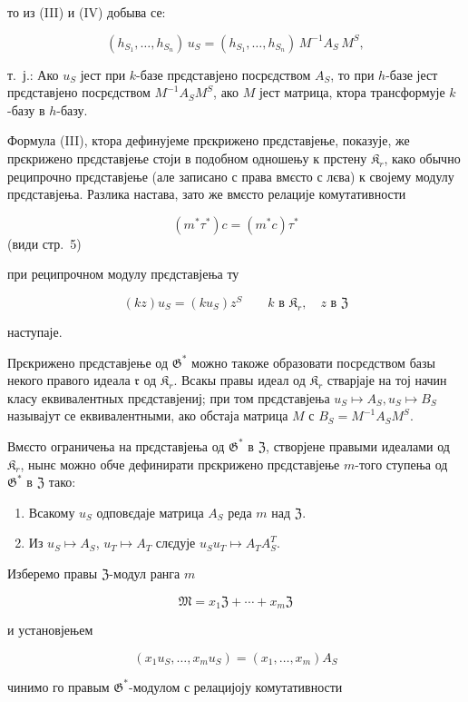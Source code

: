 \documentclass[11pt]{article}
\begin{document}
то из (III) и (IV) добыва се:

\[(h_{S_1},\ldots,h_{S_n})\,u_S=(h_{S_1},\ldots,h_{S_n})\,M^{-1}A_S\,M^S,\]

т.~ј.: Ако \(u_S\) јест при \(k\)-базе прєдставјено посрєдством \(A_S\), то при \(h\)-базе јест прєдставјено посрєдством \(M^{-1}A_SM^S\), ако \(M\) јест матрица, ктора трансформује \(k\)-базу в \(h\)-базу.

Формула (III), ктора дефинујеме прєкрижено прєдставјење, показује, же прєкрижено прєдставјење стоји в подобном одношењу к прстену \(\mathfrak K_r\), како обычно реципрочно прєдставјење (але записано с права вмєсто с лєва) к својему модулу прєдставјења. Разлика настава, зато же вмєсто релације комутативности

\[(m^*\tau^*)c = (m^*c)\tau^*\]
(види стр.~5)

при реципрочном модулу прєдставјења ту

\[
(kz)u_S=(ku_S)z^S\qquad k\text{ в }\mathfrak K_r,\quad z\text{ в }\mathfrak Z
\]

наступаје.

Прєкрижено прєдставјење од \(\mathfrak{G}^*\) можно такоже образовати посрєдством базы некого правого идеала \(\mathfrak r\) од \(\mathfrak{K}_r\). Всакы правы идеал од \(\mathfrak{K}_r\) стварјаје на тој начин класу еквивалентных прєдставјениј; при том прєдставјења \(u_S \mapsto A_S, u_S \mapsto B_S\) называјут се еквивалентными, ако обстаја матрица \(M\) с \(B_S = M^{-1}A_SM^S\).

Вмєсто ограничења на прєдставјења од \(\mathfrak G^*\) в \(\mathfrak Z\), створјене правыми идеалами од \(\mathfrak K_r\), нынє можно обче дефинирати прєкрижено прєдставјење \(m\)-того ступења од \(\mathfrak G^*\) в \(\mathfrak Z\) тако:

\begin{enumerate}
\item Всакому \(u_S\) одповєдаје матрица \(A_S\) реда \(m\) над \(\mathfrak Z\).
\item Из \(u_S \mapsto A_S\), \(u_T \mapsto A_T\) слєдује \(u_Su_T \mapsto A_TA_S^T\).
\end{enumerate}

Изберемо правы \(\mathfrak Z\)-модул ранга \(m\)

\[\mathfrak{M}=x_1\mathfrak{Z}+\cdots+x_m\mathfrak{Z}\]

и установјењем

\[(x_1u_S,\ldots,x_mu_S)=(x_1,\ldots,x_m)A_S\]

чинимо го правым \(\mathfrak G^*\)-модулом с релацијоју комутативности
\end{document}
